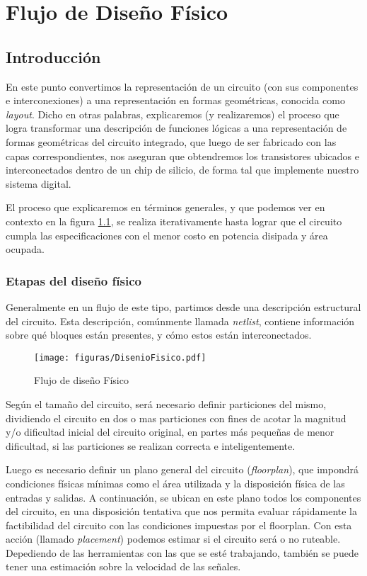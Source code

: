 \chapter{Flujo de Diseño Físico}
\section{Introducción}

En este punto convertimos la representación de un circuito (con sus componentes e interconexiones) a una representación en formas geométricas, conocida como \emph{layout}. Dicho en otras palabras, explicaremos (y realizaremos) el proceso que logra transformar una descripción de funciones lógicas a una representación de formas geométricas del circuito integrado, que luego de ser fabricado con las capas correspondientes, nos aseguran que obtendremos los transistores ubicados e interconectados dentro de un chip de silicio, de forma tal que implemente nuestro sistema digital.

El proceso que explicaremos en términos generales, y que podemos ver en contexto en la figura \ref{fig:diseñoFísico}, se realiza iterativamente hasta lograr que el circuito cumpla las especificaciones con el menor costo en potencia disipada y área ocupada.

\subsection{Etapas del diseño físico}\label{etapasDiseñoFisico}
Generalmente en un flujo de este tipo, partimos desde una descripción estructural del circuito. Esta descripción, comúnmente llamada \emph{netlist}, contiene información sobre qué bloques están presentes, y cómo estos están interconectados.

\begin{figure}[h]
\centering
\texttt{[image: figuras/DisenioFisico.pdf]}
  \caption{Flujo de diseño Físico}
  \label{fig:diseñoFísico}
\end{figure}


Según el tamaño del circuito, será necesario definir particiones del mismo, dividiendo el circuito en dos o mas particiones con fines de acotar la magnitud y/o dificultad inicial del circuito original, en partes más pequeñas de menor dificultad, si las particiones se realizan correcta e inteligentemente. 

Luego es necesario definir un plano general del circuito (\emph{floorplan}), que impondrá condiciones físicas mínimas como el área utilizada y la disposición física de las entradas y salidas.
A continuación, se ubican en este plano todos los componentes del circuito, en una disposición tentativa que nos permita evaluar rápidamente la factibilidad del circuito con las condiciones impuestas por el floorplan. Con esta acción (llamado \emph{placement}) podemos estimar si el circuito será o no ruteable. Depediendo de las herramientas con las que se esté trabajando, también se puede tener una estimación sobre la velocidad de las señales. 

